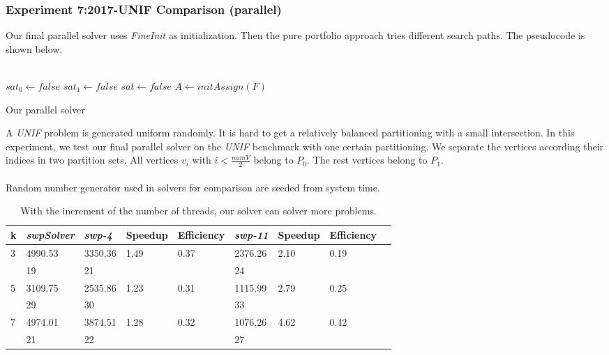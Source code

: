 \documentclass[12pt,a4paper,twoside]{scrartcl}
\numberwithin{equation}{section}
\begin{document}
\subsubsection{Experiment 7:2017-UNIF Comparison (parallel)} 
\label{sec:Experiment 7}
Our final parallel solver uses \emph{FineInit} as initialization. Then the pure portfolio approach tries different search paths. The pseudocode is shown below.\\
\\
\begin{algorithm}[H]
  $sat_0 \leftarrow false$\;
  $sat_1 \leftarrow false$\;
  $sat \leftarrow false$\;
  $A \leftarrow initAssign(F)$\;
 \caption{Our parallel solver}
\end{algorithm}  

A \emph{UNIF} problem is generated uniform randomly. It is hard to get a relatively balanced partitioning with a small intersection. In this experiment, we test our final parallel solver on the \emph{UNIF}  benchmark with one certain partitioning. We separate the vertices according their indices in two partition sets. All vertices $v_i$ with $i <\frac{numV}{2}$  belong to $P_0$. The rest vertices belong to $P_1$.\\
\\
Random number generator used in solvers for comparison are seeded from system time. 
 \begin{table}[H]
\begin{center}
    \begin{tabular}{|l|l||l|l|l||l|l|l|p{3cm}|}
\hline 
   k &\emph{swpSolver}&\emph{swp-4}&Speedup& Efficiency&\emph{swp-11}&Speedup& Efficiency\\ \hline      
    3 &4990.53&3350.36&1.49&0.37&2376.26&2.10&0.19 \\
     &19 &21&&&24&& \\ \hline
    5&3109.75	&2535.86&1.23&0.31&1115.99&2.79&0.25\\ 
    &29&30&&&33&&\\ \hline
    7& 4974.01&3874.51	&1.28&0.32&1076.26&4.62&0.42\\ 
    &21&22&&&27&&\\ \hline
    \end{tabular}
\end{center}
\caption{With the increment of the number of threads, our solver can solver more problems.}
\end{table}
\end{document}
